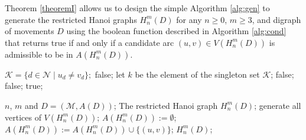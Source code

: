\documentclass[letterpaper,11pt]{article}
\begin{document}
Theorem \ref{theoremI} allows us to design the simple Algorithm \ref{alg:gen} to generate the restricted Hanoi graphs  $H_{n}^{m}(D)$ for any $n\geq 0$, $m\geq 3$, and digraph of movements $D$ using the boolean function described in Algorithm \ref{alg:cond} that returns true if and only if a candidate arc $(u,v)\in V(H_{n}^{m}(D))$ is admissible to be in  $A(H_{n}^{m}(D))$. 
\begin{algorithm}[H]
		\caption{A boolean function to decide whether an arc is in $H_{n}^{m}(D)$ or not }\label{alg:cond}
		\begin{algorithmic}[1]
                \State $\mathcal{K}=\{d\in\mathcal{N}\mid u_{d}\neq v_{d}\};$
                \State \Return false;
                \EndIf
                \State let $k$ be the  element of the singleton set $\mathcal{K}$;
                \State \Return false;
                \EndIf
                \State \Return false;
                \EndIf
                \EndFor
                \EndIf
                \State \Return true;
			\EndFunction
		\end{algorithmic}
	\end{algorithm}
	\begin{algorithm}[H]
		\caption{The restricted Hanoi graphs generator }\label{alg:gen}
		\begin{algorithmic}[1]
			\Require $n$, $m$ and $D=(\mathcal{M},A(D))$;
                \Ensure The restricted Hanoi graph $H_{n}^{m}(D)$;
                \State generate all vertices of $V(H_{n}^{m}(D))$;
                \State  $A(H_{n}^{m}(D)):=\emptyset$;
                \State $A(H_{n}^{m}(D)):=A(H_{n}^{m}(D))\cup\{(u,v)\}$;
                \EndIf
                \EndFor 
                \State \Return $H_{n}^{m}(D)$;
		\end{algorithmic}
	\end{algorithm}
\end{document}
